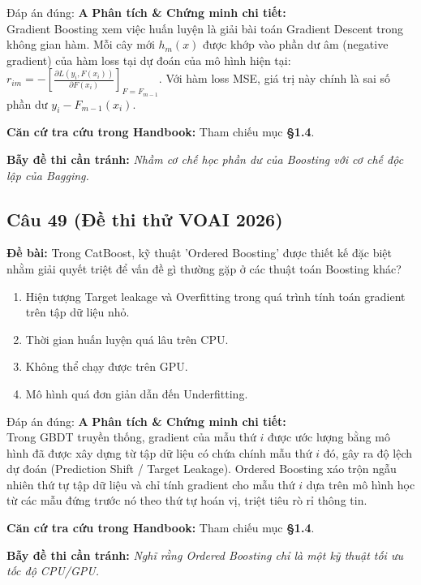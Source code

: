 \documentclass[10pt,a4paper]{article}
\begin{document}
\begin{solbox}{Đáp án đúng: \textbf{A}}
\textbf{Phân tích \& Chứng minh chi tiết:} \\
Gradient Boosting xem việc huấn luyện là giải bài toán Gradient Descent trong không gian hàm. Mỗi cây mới $h_m(x)$ được khớp vào phần dư âm (negative gradient) của hàm loss tại dự đoán của mô hình hiện tại: $r_{im} = -\left[\frac{\partial L(y_i, F(x_i))}{\partial F(x_i)}\right]_{F=F_{m-1}}$. Với hàm loss MSE, giá trị này chính là sai số phần dư $y_i - F_{m-1}(x_i)$.

\vspace{0.4em}
\textbf{Căn cứ tra cứu trong Handbook:} Tham chiếu mục \textbf{§1.4}.

\vspace{0.4em}
\textbf{Bẫy đề thi cần tránh:} \textit{Nhầm cơ chế học phần dư của Boosting với cơ chế độc lập của Bagging.}
\end{solbox}
\vspace{0.5em}


\subsection*{Câu 49 (Đề thi thử VOAI 2026)}
\textbf{Đề bài:} Trong CatBoost, kỹ thuật 'Ordered Boosting' được thiết kế đặc biệt nhằm giải quyết triệt để vấn đề gì thường gặp ở các thuật toán Boosting khác?

\begin{enumerate}[label=\textbf{\Alph*.}]
    \item Hiện tượng Target leakage và Overfitting trong quá trình tính toán gradient trên tập dữ liệu nhỏ.
    \item Thời gian huấn luyện quá lâu trên CPU.
    \item Không thể chạy được trên GPU.
    \item Mô hình quá đơn giản dẫn đến Underfitting.
\end{enumerate}

\begin{solbox}{Đáp án đúng: \textbf{A}}
\textbf{Phân tích \& Chứng minh chi tiết:} \\
Trong GBDT truyền thống, gradient của mẫu thứ $i$ được ước lượng bằng mô hình đã được xây dựng từ tập dữ liệu có chứa chính mẫu thứ $i$ đó, gây ra độ lệch dự đoán (Prediction Shift / Target Leakage). Ordered Boosting xáo trộn ngẫu nhiên thứ tự tập dữ liệu và chỉ tính gradient cho mẫu thứ $i$ dựa trên mô hình học từ các mẫu đứng trước nó theo thứ tự hoán vị, triệt tiêu rò rỉ thông tin.

\vspace{0.4em}
\textbf{Căn cứ tra cứu trong Handbook:} Tham chiếu mục \textbf{§1.4}.

\vspace{0.4em}
\textbf{Bẫy đề thi cần tránh:} \textit{Nghĩ rằng Ordered Boosting chỉ là một kỹ thuật tối ưu tốc độ CPU/GPU.}
\end{solbox}
\vspace{0.5em}
\end{document}
